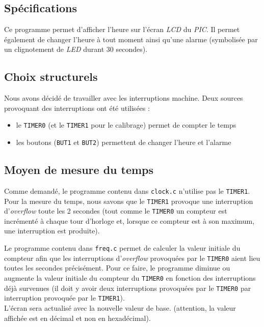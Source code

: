 \subsection{Spécifications}

Ce programme permet d'afficher l'heure sur l'écran \textit{LCD} du \textit{PIC}. Il permet également de changer l'heure à tout moment ainsi qu'une alarme (symbolisée par un clignotement de \textit{LED} durant 30 secondes).

\subsection{Choix structurels}\label{choix}

Nous avons décidé de travailler avec les interruptions machine. Deux sources provoquant des interruptions ont été utilisées :
\begin{itemize}
	\item le \texttt{TIMER0} (et le \texttt{TIMER1} pour le calibrage) permet de compter le temps
	\item les boutons (\texttt{BUT1} et \texttt{BUT2}) permettent de changer l'heure et l'alarme 
\end{itemize}

\subsection{Moyen de mesure du temps}

Comme demandé, le programme contenu dans \texttt{clock.c} n'utilise pas le \texttt{TIMER1}. Pour la mesure du temps, nous savons que le \texttt{TIMER1} provoque une interruption d'\textit{overflow} toute les 2 secondes (tout comme le \texttt{TIMER0} un compteur est incrémenté à chaque tour d'horloge et, lorsque ce compteur est à son maximum, une interruption est produite).

Le programme contenu dans \texttt{freq.c} permet de calculer la valeur initiale du compteur afin que les interruptions d'\textit{overflow} provoquées par le \texttt{TIMER0} aient lieu toutes les secondes précisément. Pour ce faire, le programme diminue ou augmente la valeur initiale du compteur du \texttt{TIMER0} en fonction des interruptions déjà survenues (il doit y avoir deux interruptions provoquées par le \texttt{TIMER0} par interruption provoquée par le \texttt{TIMER1}).\\
L'écran sera actualisé avec la nouvelle valeur de base. (attention, la valeur affichée est en décimal et non en hexadécimal).

